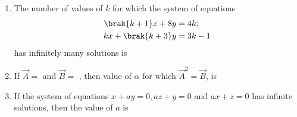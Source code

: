 \begin{enumerate}[label=\thesubsection.\arabic*.,ref=\thesubsection.\theenumi]
\begin{multicols}{4}
        \begin{enumerate}
            \item -1,2 \columnbreak
            \item 1,2 \columnbreak
            \item 0,1 \columnbreak
            \item -1,1
        \end{enumerate}
    \end{multicols}
\item The number of values of $k$ for which the system of equations 
    \begin{align*}
    \brak{k+1}x + 8y&=4k; \\ kx +\brak{k+3}y&=3k-1 \end{align*} has infinitely many solutions is 
    \hfill{}
    \begin{enumerate}
    \end{enumerate}
%
\item If $\vec{A}=$
     and $\vec{B}=$ , then value of $\alpha$ for which $\vec{A}^2 = \vec{B}$, is
    \hfill{}
    \begin{enumerate}
    \end{enumerate}
%
\item If the system of equations $x + ay = 0, az + y =0$ and $ax + z =0$ has infinite solutions, then the value of $a$ is 
    \hfill{}
    \begin{enumerate}
            \begin{multicols}{2}


\end{multicols}
\end{enumerate}
\end{enumerate}
